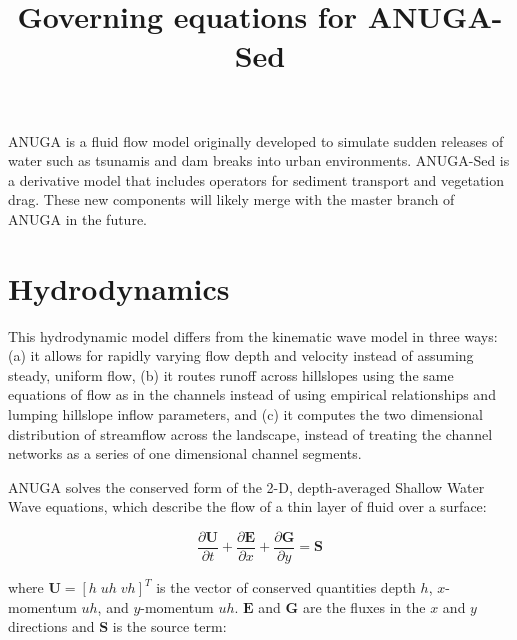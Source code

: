 \documentclass[11pt]{article}
\begin{document}
\title{Governing equations for ANUGA-Sed}
\maketitle

ANUGA is a fluid flow model originally developed to simulate sudden releases of water such as tsunamis and dam breaks into urban environments. ANUGA-Sed is a derivative model that includes operators for sediment transport and vegetation drag. These new components will likely merge with the master branch of ANUGA in the future.

\section{Hydrodynamics}

This hydrodynamic model differs from the kinematic wave model in three ways: (a) it allows for rapidly varying flow depth and velocity instead of assuming steady, uniform flow, (b) it routes runoff across hillslopes using the same equations of flow as in the channels instead of using empirical relationships and lumping hillslope inflow parameters, and (c) it computes the two dimensional distribution of streamflow across the landscape, instead of treating the channel networks as a series of one dimensional channel segments.

ANUGA solves the conserved form of the 2-D, depth-averaged Shallow Water Wave equations, which describe the flow of a thin layer of fluid over a surface:

\begin{equation}
\frac{\partial{\mathbf{U}}}{\partial{t}}+\frac{\partial{\mathbf{E}}}{\partial{x}}+\frac{\partial{\mathbf{G}}}{\partial{y}} = \mathbf{S}
\end{equation}

\noindent where $\mathbf{U} = [h\;uh\;vh]^T$ is the vector of conserved quantities depth $h$, $x$-momentum $uh$, and $y$-momentum $uh$. $\mathbf{E}$ and $\mathbf{G}$ are the fluxes in the $x$ and $y$ directions and $\mathbf{S}$ is the source term:
\end{document}

